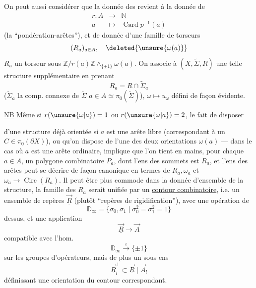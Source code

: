 On peut aussi considérer que la donnée des  revient à la donnée de
\[
 \begin{array}{rcl}
 r:A&\longrightarrow&\mathbb N\\
 a&\longmapsto&\operatorname{Card}p^{-1}(a)
 \end{array}
\]
(la ``pondération-arêtes''), et de donnée d'une famille de torseurs
\[
 (R_a)_{a\in A},\quad \deleted{\unsure{\omega(a)}}
\]
$R_a$ un torseur sous $\mathbb Z/r(a)\mathbb Z\mathbin{\wedge}_{\{\pm1\}}\omega(a)$.
On associe à $(X,\widetilde\Sigma,R)$ une telle structure supplémentaire en prenant
\[
 R_a=R\cap\widetilde\Sigma_a
\]
($\widetilde\Sigma_a$ la comp. connexe de $\widetilde\Sigma$   $a\in A\simeq\pi_0(\widetilde\Sigma)$),
$\omega\longmapsto u_\omega$ défini de façon évidente.

\uline{NB} Même si $r(\unsure{\omega|a})=1$ ou $r(\unsure{\omega|a})=2$, le fait de disposer

d'une structure déjà orientée si $a$ est une arête libre (correspondant à un $C\in\pi_0(\partial X)$), ou qu'on dispose de l'une des deux orientations $\omega(a)$ --- dans le cas où $a$ est une arête ordinaire, implique que l'on tient en mains, pour chaque $a\in A$, un polygone combinatoire $P_a$, dont l'ens des sommets est $R_a$, et l'ens des arêtes peut se décrire  de façon canonique en termes de $R_a,\omega_a$ et $\omega_a\longrightarrow\operatorname{Circ}(R_a)$.
Il peut être plus commode dans la donnée d'ensemble de la structure,  la famille des $R_a$ serait unifiée par un
\uline{contour combinatoire}, i.e. un ensemble de repères $\vec{\underline R}$ (plutôt ``repères de rigidification''), avec une opération de
\[
 \mathbb D_\infty=\{\sigma_0,\sigma_1\mid\sigma_0^2=\sigma_1^2=1\}
\]
dessus, et une application
\[
 \vec{\underline R}\longrightarrow\vec A
\]
compatible avec l'hom.
\[
 \mathbb D_\infty\xrightarrow{\varepsilon}\{\pm1\}
\]
sur les groupes d'opérateurs, mais de plus un sous ens
\[
 \vec{\underline R}_l^+\subset\vec{\underline R}\mid\vec A_l
\]
définissant une orientation du contour correspondant.

